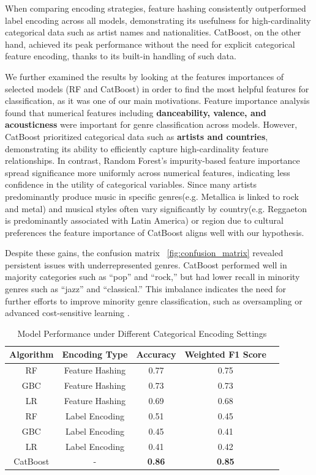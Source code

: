 \documentclass{article}
\begin{document}
When comparing encoding strategies, feature hashing consistently outperformed label encoding across all models, demonstrating its usefulness for high-cardinality categorical data such as artist names and nationalities. CatBoost, on the other hand, achieved its peak performance without the need for explicit categorical feature encoding, thanks to its built-in handling of such data.

We further examined the results by looking at the features importances of selected models (RF and CatBoost) in order to find the most helpful features for classification, as it was one of our main motivations.  Feature importance analysis found that numerical features including \textbf{danceability, valence, and acousticness} were important for genre classification across models. However, CatBoost prioritized categorical data such as \textbf{artists and countries}, demonstrating its ability to efficiently capture high-cardinality feature relationships. In contrast, Random Forest’s impurity-based feature importance spread significance more uniformly across numerical features, indicating less confidence in the utility of categorical variables. Since many artists predominantly produce music in specific genres(e.g. Metallica is linked to rock and metal) and musical styles often vary significantly by country(e.g. Reggaeton is predominantly associated with Latin America) or region due to cultural preferences the feature importance of CatBoost aligns well with our hypothesis.

Despite these gains, the confusion matrix ~\ref{fig:confusion_matrix} revealed persistent issues with underrepresented genres. CatBoost performed well in majority categories such as ``pop'' and ``rock,'' but had lower recall in minority genres such as ``jazz'' and ``classical.'' This imbalance indicates the need for further efforts to improve minority genre classification, such as oversampling or advanced cost-sensitive learning \cite{krishnapuram2011cost}.


\begin{table}[h!]
\centering
\captionsetup{belowskip=12pt,aboveskip=8pt} 
\begin{tabular}{|c|c|c|c|c|}
\hline
\textbf{Algorithm} & \textbf{Encoding Type} & \textbf{Accuracy} & \textbf{Weighted F1 Score} \\
\hline
RF  & Feature Hashing & 0.77 & 0.75 \\
GBC & Feature Hashing & 0.73 & 0.73 \\
LR  & Feature Hashing & 0.69 & 0.68 \\
\hline
RF  & Label Encoding  & 0.51 & 0.45 \\
GBC & Label Encoding  & 0.45 & 0.41 \\
LR  & Label Encoding  & 0.41 & 0.42 \\
\hline
CatBoost & -  & \textbf{0.86} & \textbf{0.85} \\
\hline
\end{tabular}
\caption{Model Performance under Different Categorical Encoding Settings}
\label{tab:performance}
\end{table}
\end{document}
